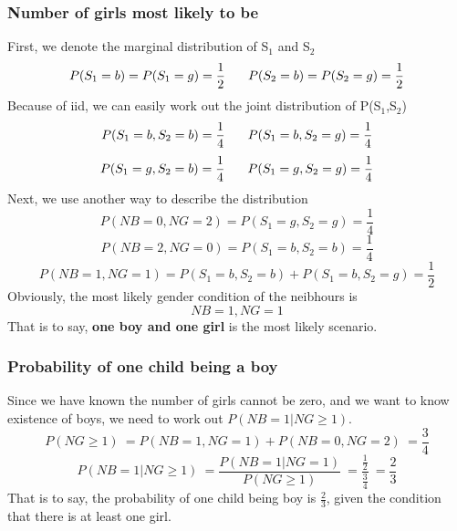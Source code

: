 \documentclass[11pt,a4paper]{article}
\newcommand{\htab}{\hspace*{0.63cm}}
\begin{document}
\subsubsection{Number of girls most likely to be}
\htab First, we denote the marginal distribution of S$_{1}$ and S$_{2}$
    \begin{equation}
        P(S_{1} = b) = P(S_{1} = g) = \frac{1}{2} \htab P(S_{2} = b) = P(S_{2} = g) = \frac{1}{2} 
    \end{equation}
\htab Because of iid, we can easily work out the joint distribution of P(S$_{1}$,S$_{2}$)
    \begin{equation} 
        P(S_{1} = b, S_{2} = b) = \frac{1}{4} \htab P(S_{1} = b, S_{2} = g) = \frac{1}{4} 
    \end{equation}
    \begin{equation} 
        P(S_{1} = g, S_{2} = b) = \frac{1}{4} \htab P(S_{1} = g, S_{2} = g) = \frac{1}{4} 
    \end{equation}
\htab Next, we use another way to describe the distribution
    \begin{equation}
        P(NB = 0, NG = 2) = P(S_{1} = g, S_{2} = g) = \frac{1}{4} 
    \end{equation}
    \begin{equation} 
        P(NB = 2, NG = 0) = P(S_{1} = b, S_{2} = b) = \frac{1}{4} 
    \end{equation}
    \begin{equation}
        P(NB = 1, NG = 1) = P(S_{1} = b, S_{2} = b) + P(S_{1} = b, S_{2} = g) = \frac{1}{2}
    \end{equation}
\htab Obviously, the most likely gender condition of the neibhours is
    \begin{equation}
        NB = 1 , NG = 1
    \end{equation}
\htab That is to say, \textbf{one boy and one girl} is the most likely scenario.
%
\subsubsection{Probability of one child being a boy}
\htab Since we have known the number of girls cannot be zero, and we want to know existence of boys, we need to work out $P(NB = 1|NG \geq 1)$.
    \begin{equation} 
        P(NG \geq 1) \ 
        = P(NB = 1, NG = 1) + P(NB = 0, NG = 2) \ 
        = \frac{3}{4}
    \end{equation}
    \begin{equation} P(NB = 1 | NG \geq 1) \
        = \frac{P(NB = 1 | NG = 1)}{P(NG \geq 1)} \
        = \frac{\frac{1}{2}}{\frac{3}{4}} \ 
        = \frac{2}{3} 
    \end{equation}
\htab That is to say, the probability of one child being boy is $\frac{2}{3}$, given the condition that there is at least one girl.
\end{document}
